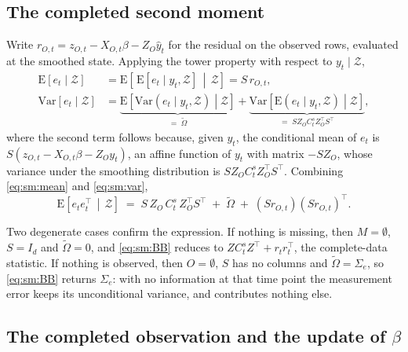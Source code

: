 \documentclass[11pt]{article}
\begin{document}
\subsection{The completed second moment}

Write $r_{O,t} = z_{O,t} - X_{O,t}\beta - Z_{O} \hat{y}_t$ for the residual on the observed rows, evaluated at the smoothed state. Applying the tower property with respect to $y_t \mid \mathcal{Z}$,
\begin{align}
  \mathrm{E}\!\left[e_t \mid \mathcal{Z}\right]
    &= \mathrm{E}\!\left[\, \mathrm{E}\!\left[e_t \mid y_t, \mathcal{Z}\right] \,\middle|\, \mathcal{Z}\right]
     = S\, r_{O,t}, \label{eq:sm:mean}\\[2pt]
  \mathrm{Var}\!\left[e_t \mid \mathcal{Z}\right]
    &= \underbrace{\mathrm{E}\!\left[\mathrm{Var}\!\left(e_t \mid y_t, \mathcal{Z}\right) \middle| \mathcal{Z}\right]}_{= \;\tilde{\Omega}}
     + \underbrace{\mathrm{Var}\!\left[\mathrm{E}\!\left(e_t \mid y_t, \mathcal{Z}\right) \middle| \mathcal{Z}\right]}_{= \; S Z_O C^s_t Z_O^\top S^\top}, \label{eq:sm:var}
\end{align}
where the second term follows because, given $y_t$, the conditional mean of $e_t$ is $S\left(z_{O,t} - X_{O,t}\beta - Z_O y_t\right)$, an affine function of $y_t$ with matrix $-S Z_O$, whose variance under the smoothing distribution is $S Z_O C^s_t Z_O^\top S^\top$. Combining \eqref{eq:sm:mean} and \eqref{eq:sm:var},
\begin{equation}\label{eq:sm:BB}
  \boxed{\;
  \mathrm{E}\!\left[e_t e_t^\top \,\middle|\, \mathcal{Z}\right]
  \;=\; S\, Z_O\, C^s_t\, Z_O^\top S^\top \;+\; \tilde{\Omega} \;+\; \left(S r_{O,t}\right)\left(S r_{O,t}\right)^{\top}. \;}
\end{equation}

Two degenerate cases confirm the expression. If nothing is missing, then $M = \emptyset$, $S = I_d$ and $\tilde{\Omega} = 0$, and \eqref{eq:sm:BB} reduces to $Z C^s_t Z^\top + r_t r_t^\top$, the complete-data statistic. If nothing is observed, then $O = \emptyset$, $S$ has no columns and $\tilde{\Omega} = \Sigma_e$, so \eqref{eq:sm:BB} returns $\Sigma_e$: with no information at that time point the measurement error keeps its unconditional variance, and contributes nothing else.

\subsection{The completed observation and the update of \texorpdfstring{$\beta$}{beta}}
\end{document}
